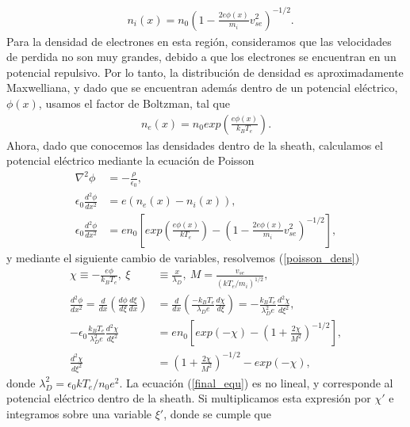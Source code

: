 \documentclass[../main.tex]{subfiles}
\begin{document}
    \begin{align}
       & n_i(x) = n_0\left(1 - \frac{2e\phi \left(x\right)}{m_i}v_{se}^2\right)^{-1/2}. \label{densidad_sheath}
    \end{align}
    Para la densidad de electrones en esta región, consideramos que las velocidades de perdida no son muy grandes, debido a que los electrones se encuentran en un potencial repulsivo. Por lo tanto, la distribución de densidad es aproximadamente Maxwelliana, y dado que se encuentran además dentro de un potencial eléctrico, $\phi(x)$, usamos el factor de Boltzman, tal que
    \begin{align}
        n_e\left(x\right) = n_0exp\left(\frac{e\phi\left(x\right)}{k_BT_e}\right).
    \end{align}
    Ahora, dado que conocemos las densidades dentro de la sheath, calculamos el potencial eléctrico mediante la ecuación de Poisson
        \begin{align}
        \nabla^2 \phi &= -\frac{\rho}{\epsilon_0}, \\
        \epsilon_0 \frac{d^2\phi}{dx^2} &= e\left ( n_e\left(x\right) - n_i\left(x\right) \right), \\
        \epsilon_0 \frac{d^2\phi}{dx^2} &=  en_0\left[exp\left( \frac{e\phi\left(x\right)}{kT_e} \right) - \left(1 -\frac{2e\phi\left(x\right)}{m_i}v_{se}^2 \right)^{-1/2} \right], \label{poisson_dens}
        \end{align}
    y mediante el siguiente cambio de variables, resolvemos (\ref{poisson_dens})
    \begin{align}
        \chi \equiv -\frac{e\phi}{k_BT_e}, \ \xi &\equiv \frac{x}{\lambda_D}, \ M = \frac{v_{se}}{\left( kT_e/m_i \right)^{1/2}}, \\
        \frac{d^2\phi}{dx^2} = \frac{d}{dx}\left( \frac{d\phi}{d\xi}\frac{d\xi}{dx} \right) &= \frac{d}{dx}\left( \frac{-k_BT_e}{\lambda_De}\frac{d\chi}{d\xi} \right) = -\frac{k_BT_e}{\lambda_D^2e} \frac{d^2\chi}{d\xi^2}, \\
        -\epsilon_0 \frac{k_BT_e}{\lambda_D^2e}\frac{d^2\chi}{d\xi^2} &= en_0 \left[ exp\left(-\chi \right) - \left( 1 + \frac{2\chi}{M^2} \right)^{-1/2} \right], \\
        \frac{d^2\chi}{d\xi^2} &= \left( 1+\frac{2\chi}{M^2} \right)^{-1/2} - exp\left( -\chi \right), \label{final_equ}
    \end{align}
    donde $\lambda_D^2 = \epsilon_0kT_e/n_0e^2$. La ecuación (\ref{final_equ}) es no lineal, y corresponde al potencial eléctrico dentro de la sheath. Si multiplicamos esta expresión por $\chi\prime$ e integramos sobre una variable $\xi\prime$, donde se cumple que
\end{document}

